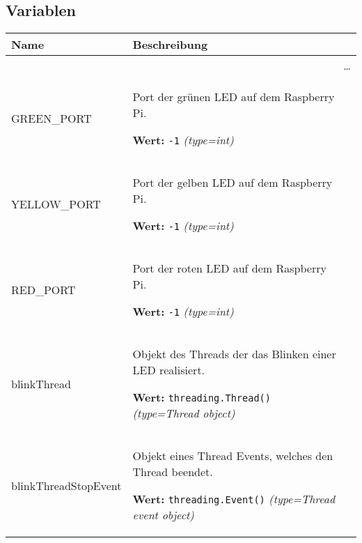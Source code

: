 
  \subsection{Variablen}

    \vspace{-1cm}
\hspace{\varindent}\begin{longtable}{|p{\varnamewidth}|p{\vardescrwidth}|l}
\cline{1-2}
\cline{1-2} \centering \textbf{Name} & \centering \textbf{Beschreibung}& \\
\cline{1-2}
\endhead\cline{1-2}\multicolumn{3}{r}{\small\ldots}\\\endfoot\cline{1-2}
\endlastfoot\raggedright G\-R\-E\-E\-N\-\_\-P\-O\-R\-T\- & \raggedright Port der grünen LED auf dem Raspberry Pi.

\textbf{Wert:} 
{\tt -1}            {\it (type=int)}&\\
\cline{1-2}
\raggedright Y\-E\-L\-L\-O\-W\-\_\-P\-O\-R\-T\- & \raggedright Port der gelben LED auf dem Raspberry Pi.

\textbf{Wert:} 
{\tt -1}            {\it (type=int)}&\\
\cline{1-2}
\raggedright R\-E\-D\-\_\-P\-O\-R\-T\- & \raggedright Port der roten LED auf dem Raspberry Pi.

\textbf{Wert:} 
{\tt -1}            {\it (type=int)}&\\
\cline{1-2}
\raggedright b\-l\-i\-n\-k\-T\-h\-r\-e\-a\-d\- & \raggedright Objekt des Threads der das Blinken einer LED realisiert.

\textbf{Wert:} 
{\tt threading.Thread()}            {\it (type=Thread object)}&\\
\cline{1-2}
\raggedright b\-l\-i\-n\-k\-T\-h\-r\-e\-a\-d\-S\-t\-o\-p\-E\-v\-e\-n\-t\- & \raggedright Objekt eines Thread Events, welches den Thread beendet.

\textbf{Wert:} 
{\tt threading.Event()}            {\it (type=Thread event object)}&\\
\cline{1-2}
\end{longtable}


